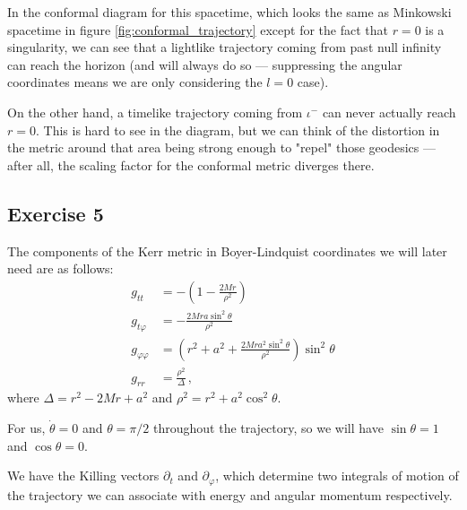 \documentclass[main.tex]{subfiles}
\begin{document}
In the conformal diagram for this spacetime, which looks the same as Minkowski spacetime in figure \ref{fig:conformal_trajectory} except for the fact that \(r = 0\) is a singularity, we can see that a lightlike trajectory coming from past null infinity can reach the horizon (and will always do so --- suppressing the angular coordinates means we are only considering the \(l = 0\) case).

On the other hand, a timelike trajectory coming from \(\iota^-\) can never actually reach \(r = 0\). 
This is hard to see in the diagram, but we can think of the distortion in the metric around that area being strong enough to "repel" those geodesics --- after all, the scaling factor for the conformal metric diverges there.

\subsection{Exercise 5}

The components of the Kerr metric in Boyer-Lindquist coordinates we will later need are as follows: 
%
\begin{align}
g_{tt} &= - \left(1 - \frac{2Mr}{\rho^2}\right)  \\
g_{t \varphi } &= - \frac{2 M r a \sin^2 \theta }{\rho^2}  \\
g_{\varphi \varphi } &=  \left( r^2 + a^2 + \frac{2 M r a^2 \sin^2 \theta }{\rho^2} \right) \sin^2 \theta  \\
g_{rr} &= \frac{\rho^2}{\Delta }
\,,
\end{align}
%
where \(\Delta = r^2 - 2Mr + a^2\) and \(\rho^2 = r^2 + a^2 \cos^2 \theta \).

For us, \(\dot{\theta} = 0\) and \(\theta = \pi /2\) throughout the 
trajectory, so we will have \(\sin \theta = 1\) and \(\cos \theta = 0\).

We have the Killing vectors \(\partial_t\) and \(\partial_\varphi \), which determine two integrals of motion of the trajectory we can associate with energy and angular momentum respectively. 
\end{document}

